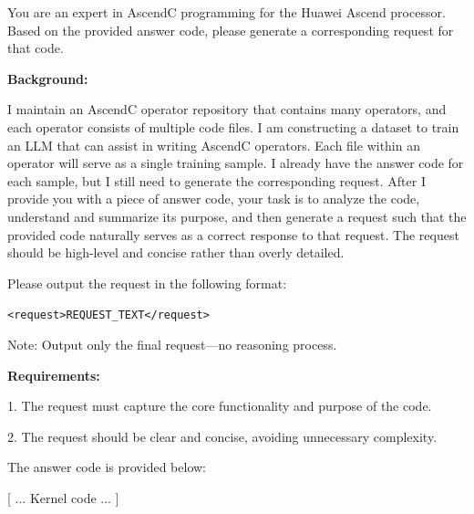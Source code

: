 \begin{table}
\vspace{-20pt}
\centering
\begin{tcolorbox}[
    sharp corners,
      colframe=reforange,
      colback=reforange!5,
      colbacktitle=reforange!15,
      coltitle=reforange,
      boxrule=0.4pt,
      title={\textbf{Prompt for generating question}},
      fonttitle=\bfseries\small,
      left=0.5pt,
      right=0.5pt,
      top=0.5pt,
      bottom=0.5pt
]
{\small
You are an expert in AscendC programming for the Huawei Ascend processor. Based on the provided answer code, please generate a corresponding request for that code.

\textbf{Background:} 

I maintain an AscendC operator repository that contains many operators, and each operator consists of multiple code files. I am constructing a dataset to train an LLM that can assist in writing AscendC operators. Each file within an operator will serve as a single training sample. I already have the answer code for each sample, but I still need to generate the corresponding request. After I provide you with a piece of answer code, your task is to analyze the code, understand and summarize its purpose, and then generate a request such that the provided code naturally serves as a correct response to that request. The request should be high-level and concise rather than overly detailed.

Please output the request in the following format:

\verb|<request>REQUEST_TEXT</request>| 

Note: Output only the final request—no reasoning process.

\textbf{Requirements:}

1. The request must capture the core functionality and purpose of the code.

2. The request should be clear and concise, avoiding unnecessary complexity.

The answer code is provided below:

[ ... Kernel code ... ]

}
\end{tcolorbox}


\end{table}

